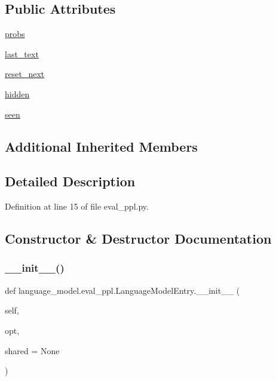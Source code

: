 \subsection*{Public Attributes}
\begin{DoxyCompactItemize}
\item 
\hyperlink{classlanguage__model_1_1eval__ppl_1_1LanguageModelEntry_a56bd1620561edf44373182bf5324d1bd}{probs}
\item 
\hyperlink{classlanguage__model_1_1eval__ppl_1_1LanguageModelEntry_af1143417ff0e3910c4fabc386e17ff94}{last\+\_\+text}
\item 
\hyperlink{classlanguage__model_1_1eval__ppl_1_1LanguageModelEntry_a57e88deff0cee954bca24b4ff34c7729}{reset\+\_\+next}
\item 
\hyperlink{classlanguage__model_1_1eval__ppl_1_1LanguageModelEntry_a7c97d0414fa78165b9d85cc4399ac87d}{hidden}
\item 
\hyperlink{classlanguage__model_1_1eval__ppl_1_1LanguageModelEntry_a3beb0703ab3b39e2c38956978435fd17}{seen}
\end{DoxyCompactItemize}
\subsection*{Additional Inherited Members}


\subsection{Detailed Description}


Definition at line 15 of file eval\+\_\+ppl.\+py.



\subsection{Constructor \& Destructor Documentation}
\mbox{\label{classlanguage__model_1_1eval__ppl_1_1LanguageModelEntry_a295c7e2f6cb59aca07f985d82e4f34c5}} 
\subsubsection{\texorpdfstring{\+\_\+\+\_\+init\+\_\+\+\_\+()}{\_\_init\_\_()}}
{\footnotesize\ttfamily def language\+\_\+model.\+eval\+\_\+ppl.\+Language\+Model\+Entry.\+\_\+\+\_\+init\+\_\+\+\_\+ (\begin{DoxyParamCaption}\item[{}]{self,  }\item[{}]{opt,  }\item[{}]{shared = {\ttfamily None} }\end{DoxyParamCaption})}



